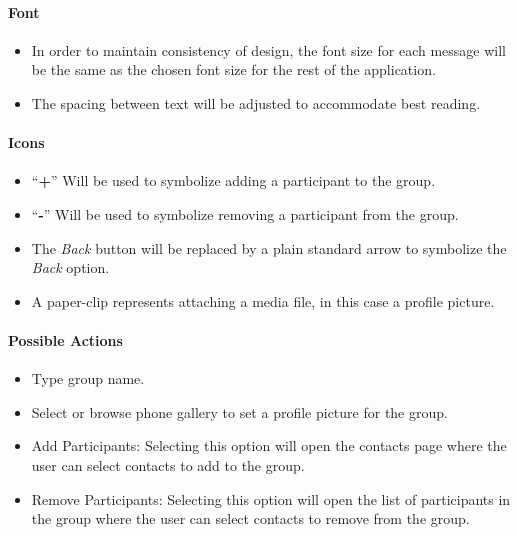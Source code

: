 \documentclass[11pt]{article}
\begin{document}
\paragraph{Font}
\begin{itemize}
\item	In order to maintain consistency of design, the font size for each message will be the same as the chosen font size for the rest of the application.
\item The spacing between text will be adjusted to accommodate best reading.\\
\end{itemize}

\paragraph{Icons}
\begin{itemize}
\item	\enquote{\textbf{+}} Will be used to symbolize adding a participant to the group.  
\item \enquote{\textbf{-}} Will be used to symbolize removing a participant from the group.
\item The \textit{Back} button will be replaced by a plain standard arrow to symbolize the \textit{Back} option. 
\item A paper-clip represents attaching a media file, in this case a profile picture.  
\end{itemize}

\paragraph{Possible Actions}
\begin{itemize}
\item Type group name.
\item Select or browse phone gallery to set a profile picture for the group.
\item	Add Participants: Selecting this option will open the contacts page where the user can select contacts to add to the group.
\item 	Remove Participants: Selecting this option will open the list of participants in the group where the user can select contacts to remove from the group.
\end{itemize}
\end{document}
